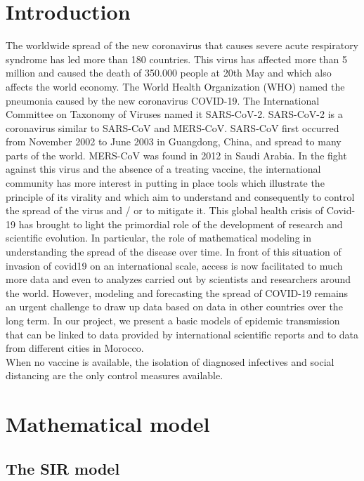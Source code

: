 \documentclass[final,a4paper,reqno]{elsarticle}
\numberwithin{equation}{section}
\begin{document}
\section{Introduction}\label{sec:intro}
The worldwide spread of the new  coronavirus that causes severe acute  respiratory  syndrome   has  led more than 180  countries. 
This virus has affected more than  5 million and caused the death of  350.000 people  at 20th May and which also affects the world economy.  The World Health Organization (WHO) named the pneumonia caused by the new coronavirus COVID-19. The International Committee on Taxonomy of Viruses named it  SARS-CoV-2.  SARS-CoV-2 is a coronavirus similar to SARS-CoV and MERS-CoV. SARS-CoV first occurred from November 2002 to June 2003 in Guangdong, China, and spread to many parts of the world. MERS-CoV was found in 2012 in Saudi Arabia. In the fight against this virus and the absence of a treating vaccine, the international community has more interest in putting in place tools which illustrate the principle of its virality and which aim to understand and consequently to control the spread of the virus and / or to mitigate it. This global health crisis of Covid-19 has brought to light the primordial role of the development of research and scientific evolution. In particular, the role of mathematical modeling in understanding the spread of the disease over time.  In front of this situation of invasion of covid19 on an international scale, access is now facilitated to much more data and even to analyzes carried out by scientists and researchers around the world. However, modeling and forecasting the spread of COVID-19 remains an urgent challenge to draw up data based on data in other countries over the long term. In our project, we present a basic models of epidemic transmission that can be linked to data provided by international scientific reports and to data from different cities in Morocco. \\

When no vaccine is available, the isolation of diagnosed infectives and social distancing are the only control measures available.\\
%


\section{Mathematical model }

\subsection{ The SIR  model }\label{sir}
\end{document}
